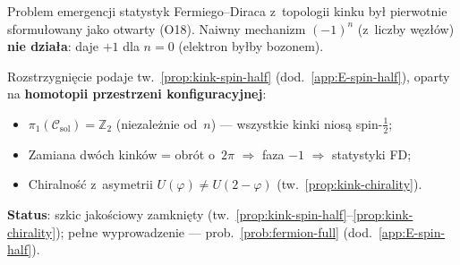 \begin{remark}%
\label{rem:fermion-statistics-status}
Problem emergencji statystyk Fermiego--Diraca z~topologii kinku
by\l{} pierwotnie sformu\l{}owany jako otwarty (O18).
Naiwny mechanizm $(-1)^n$ (z~liczby w\k{e}z\l{}\'ow)
\textbf{nie dzia\l{}a}: daje $+1$ dla $n=0$ (elektron by\l{}by bozonem).

Rozstrzygni\k{e}cie podaje tw.~\ref{prop:kink-spin-half}
(dod.~\ref{app:E-spin-half}), oparty na \textbf{homotopii
przestrzeni konfiguracyjnej}:
\begin{itemize}[nosep]
  \item $\pi_1(\mathcal{C}_{\mathrm{sol}}) = \mathbb{Z}_2$
    (niezale\.znie od~$n$) --- wszystkie kinki nios\k{a}
    spin-$\tfrac{1}{2}$;
  \item Zamiana dw\'och kink\'ow = obr\'ot o~$2\pi$
    $\Rightarrow$ faza $-1$ $\Rightarrow$ statystyki FD;
  \item Chiralno\'s\'c z~asymetrii $U(\varphi) \neq U(2-\varphi)$
    (tw.~\ref{prop:kink-chirality}).
\end{itemize}
\textbf{Status}: szkic jako\'sciowy zamkni\k{e}ty
(tw.~\ref{prop:kink-spin-half}--\ref{prop:kink-chirality});
pe\l{}ne wyprowadzenie --- prob.~\ref{prob:fermion-full}
(dod.~\ref{app:E-spin-half}).
\end{remark}

